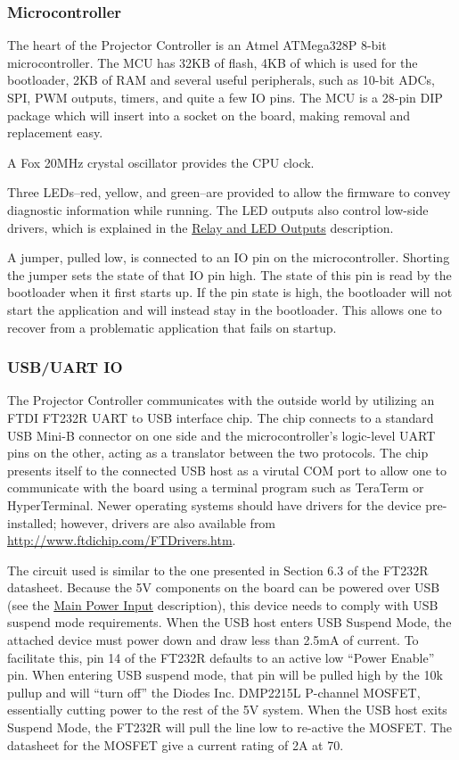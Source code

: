 \documentclass{article}
\begin{document}
\subsubsection{Microcontroller} \label{sssec:Microcontroller}
The heart of the Projector Controller is an Atmel ATMega328P 8-bit microcontroller.  The MCU has
32KB of flash, 4KB of which is used for the bootloader, 2KB of RAM and several useful peripherals,
such as 10-bit ADCs, SPI, PWM outputs, timers, and quite a few IO pins.  The MCU is a 28-pin DIP
package which will insert into a socket on the board, making removal and replacement easy.

A Fox 20MHz crystal oscillator provides the CPU clock.

Three LEDs--red, yellow, and green--are provided to allow the firmware to convey diagnostic
information while running.  The LED outputs also control low-side drivers, which is explained in the
\hyperref[sssec:RelayLED]{Relay and LED Outputs} description.

A jumper, pulled low, is connected to an IO pin on the microcontroller.  Shorting the jumper sets
the state of that IO pin high.  The state of this pin is read by the bootloader when it first starts
up.  If the pin state is high, the bootloader will not start the application and will instead stay
in the bootloader.  This allows one to recover from a problematic application that fails on startup.

\subsubsection{USB/UART IO} \label{sssec:USBUART}
The Projector Controller communicates with the outside world by utilizing an FTDI FT232R UART to
USB interface chip.  The chip connects to a standard USB Mini-B connector on one side and the
microcontroller's logic-level UART pins on the other, acting as a translator between the two
protocols.  The chip presents itself to the connected USB host as a virutal COM port to
allow one to communicate with the board using a terminal program such as TeraTerm or HyperTerminal.
Newer operating systems should have drivers for the device pre-installed; however, drivers are also
available from \url{http://www.ftdichip.com/FTDrivers.htm}.

The circuit used is similar to the one presented in Section 6.3 of the FT232R datasheet.  Because
the 5V components on the board can be powered over USB (see the \hyperref[sssec:MainPower]{Main
  Power Input} description), this device needs to comply with USB suspend mode requirements.  When
the USB host enters USB Suspend Mode, the attached device must power down and draw less than 2.5mA
of current.  To facilitate this, pin 14 of the FT232R defaults to an active low ``Power Enable'' pin.
When entering USB suspend mode, that pin will be pulled high by the 10k\textOmega{} pullup and will
``turn off'' the Diodes Inc. DMP2215L P-channel MOSFET, essentially cutting power to the rest of the
5V system.  When the USB host exits Suspend Mode, the FT232R will pull the line low to re-active the
MOSFET.  The datasheet for the MOSFET give a current rating of 2A at 70\textcelsius{}.
\end{document}

